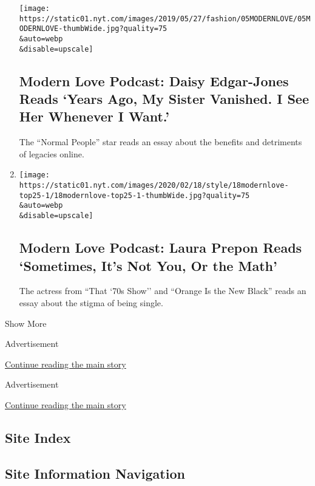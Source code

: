 \begin{enumerate}
  \texttt{[image: https://static01.nyt.com/images/2019/05/27/fashion/05MODERNLOVE/05MODERNLOVE-thumbWide.jpg?quality=75\\\&auto=webp\\\&disable=upscale]}

  \hypertarget{modern-love-podcast-daisy-edgar-jones-reads-years-ago-my-sister-vanished-i-see-her-whenever-i-want}{%
  \subsection{Modern Love Podcast: Daisy Edgar-Jones Reads `Years Ago,
  My Sister Vanished. I See Her Whenever I
  Want.'}\label{modern-love-podcast-daisy-edgar-jones-reads-years-ago-my-sister-vanished-i-see-her-whenever-i-want}}

  The ``Normal People'' star reads an essay about the benefits and
  detriments of legacies online.
\item
  \href{/2020/04/22/style/modern-love-podcast-laura-prepon.html}{}

  \texttt{[image: https://static01.nyt.com/images/2020/02/18/style/18modernlove-top25-1/18modernlove-top25-1-thumbWide.jpg?quality=75\\\&auto=webp\\\&disable=upscale]}

  \hypertarget{modern-love-podcast-laura-prepon-reads-sometimes-its-not-you-or-the-math}{%
  \subsection{Modern Love Podcast: Laura Prepon Reads `Sometimes, It's
  Not You, Or the
  Math'}\label{modern-love-podcast-laura-prepon-reads-sometimes-its-not-you-or-the-math}}

  The actress from ``That `70s Show'' and ``Orange Is the New Black''
  reads an essay about the stigma of being single.
\end{enumerate}

Show More

Advertisement

\protect\hyperlink{after-mid1}{Continue reading the main story}

Advertisement

\protect\hyperlink{after-mktg}{Continue reading the main story}

\hypertarget{site-index}{%
\subsection{Site Index}\label{site-index}}

\hypertarget{site-information-navigation}{%
\subsection{Site Information
Navigation}\label{site-information-navigation}}

